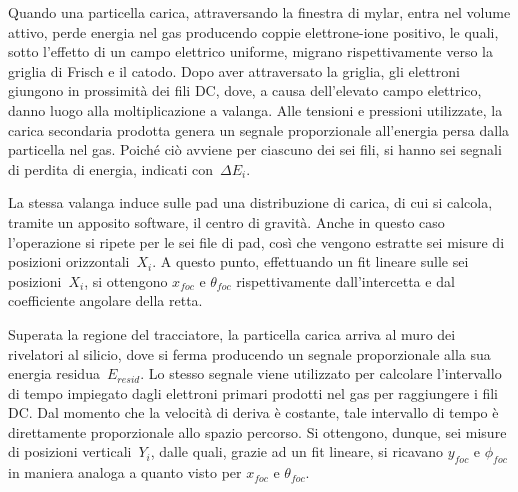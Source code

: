 Quando una particella carica, attraversando la finestra di mylar, entra nel volume attivo, perde energia nel gas producendo coppie elettrone-ione positivo, le quali, sotto l'effetto di un campo elettrico uniforme, migrano rispettivamente verso la griglia di Frisch e il catodo. 
Dopo aver attraversato la griglia, gli elettroni giungono in prossimità dei fili DC, dove, a causa dell'elevato campo elettrico, danno luogo alla moltiplicazione a valanga. 
Alle tensioni e pressioni utilizzate, la carica secondaria prodotta genera un segnale proporzionale all'energia persa dalla particella nel gas. 
Poiché ciò avviene per ciascuno dei sei fili, si hanno sei segnali di perdita di energia, indicati con~$\Delta E_i$.





La stessa valanga induce sulle pad una distribuzione di carica, di cui si calcola, tramite un apposito software, il centro di gravità. Anche in questo caso l'operazione si ripete per le sei file di pad, così che vengono estratte sei misure di posizioni orizzontali~$X_i$.
A questo punto, effettuando un fit lineare sulle sei posizioni~$X_i$, si ottengono $x_{foc}$ e $\theta_{foc}$ rispettivamente dall'intercetta e dal coefficiente angolare della retta.

Superata la regione del tracciatore, la particella carica arriva al muro dei rivelatori al silicio, dove si ferma producendo un segnale proporzionale alla sua energia residua~$E_{resid}$. 
Lo stesso segnale viene utilizzato per calcolare l'intervallo di tempo impiegato dagli elettroni primari prodotti nel gas per raggiungere i fili DC. 
Dal momento che la velocità di deriva è costante, tale intervallo di tempo è direttamente proporzionale allo spazio percorso. Si ottengono, dunque, sei misure di posizioni verticali~$Y_i$, dalle quali, grazie ad un fit lineare, si ricavano $y_{foc}$ e $\phi_{foc}$ in maniera analoga a quanto visto per $x_{foc}$ e $\theta_{foc}$.

